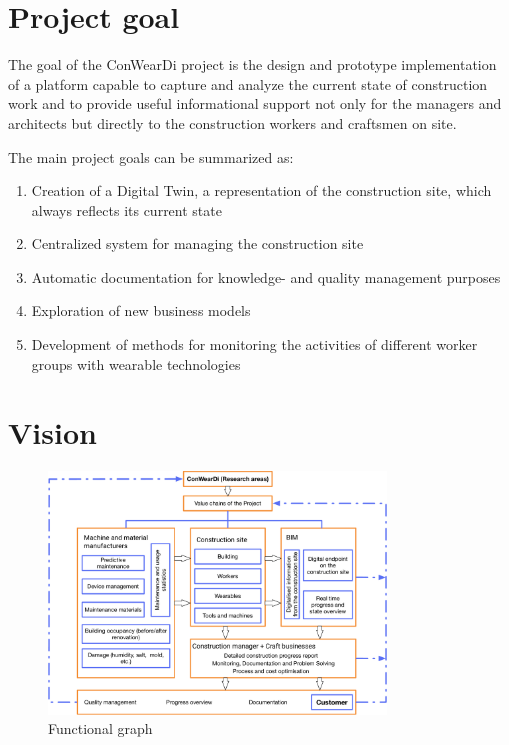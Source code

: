 \section{Project goal}
The goal of the ConWearDi project is the design and prototype implementation of a platform capable to capture and analyze the current state of construction work and to provide useful informational support not only for the managers and architects but directly to the construction workers and craftsmen on site. 


The main project goals can be summarized as:
\begin{enumerate}
  \item Creation of a Digital Twin, a representation of the construction site, which always reflects its current state 
  \item Centralized system for managing the construction site
  \item Automatic documentation for knowledge- and quality management purposes
  \item Exploration of new business models
  \item Development of methods for monitoring the activities of different worker groups with wearable technologies
\end{enumerate}

\section{Vision}

\begin{figure}[htp]
\includegraphics[width=0.8\textwidth]{figures/conweardi-functional.pdf}
\caption{Functional graph}
\label{fig:functional}
\end{figure}

